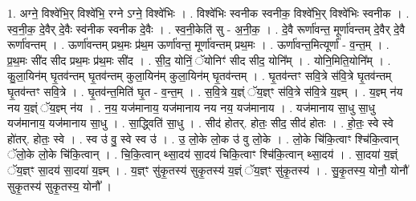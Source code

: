 \documentclass[17pt]{extarticle}
\begin{document}
1. अग्ने॒ विश्वे॑भि॒र् विश्वे॑भि॒ रग्ने ऽग्ने॒ विश्वे॑भिः । . विश्वे॑भिः स्वनीक स्वनीक॒ विश्वे॑भि॒र् विश्वे॑भिः स्वनीक । . स्व॒नी॒क॒ दे॒वैर् दे॒वैः स्व॑नीक स्वनीक दे॒वैः । . स्व॒नी॒केति॑ सु - अ॒नी॒क॒ । . दे॒वै रूर्णा॑वन्त॒ मूर्णा॑वन्तम् दे॒वैर् दे॒वै रूर्णा॑वन्तम् । . ऊर्णा॑वन्तम् प्रथ॒मः प्र॑थ॒म ऊर्णा॑वन्त॒ मूर्णा॑वन्तम् प्रथ॒मः । . ऊर्णा॑वन्त॒मित्यूर्णा᳚ - व॒न्त॒म् । . प्र॒थ॒मः सी॑द सीद प्रथ॒मः प्र॑थ॒मः सी॑द । . सी॒द॒ योनिं॒ ॅयोनिꣳ॑ सीद सीद॒ योनि᳚म् । . योनि॒मिति॒योनि᳚म् । . कु॒ला॒यिन॑म् घृ॒तव॑न्तम् घृ॒तव॑न्तम् कुला॒यिन॑म् कुला॒यिन॑म् घृ॒तव॑न्तम् । . घृ॒तव॑न्तꣳ सवि॒त्रे स॑वि॒त्रे घृ॒तव॑न्तम् घृ॒तव॑न्तꣳ सवि॒त्रे । . घृ॒तव॑न्त॒मिति॑ घृ॒त - व॒न्त॒म् । . स॒वि॒त्रे य॒ज्ञ्ं ॅय॒ज्ञ्ꣳ स॑वि॒त्रे स॑वि॒त्रे य॒ज्ञ्म् । . य॒ज्ञ्म् न॑य नय य॒ज्ञ्ं ॅय॒ज्ञ्म् न॑य । . न॒य॒ यज॑मानाय॒ यज॑मानाय नय नय॒ यज॑मानाय । . यज॑मानाय सा॒धु सा॒धु यज॑मानाय॒ यज॑मानाय सा॒धु । . सा॒द्ध्विति॑ सा॒धु । . सीद॑ होतर्. होतः॒ सीद॒ सीद॑ होतः । . हो॒तः॒ स्वे स्वे हो॑तर्. होतः॒ स्वे । . स्व उ॑ वु॒ स्वे स्व उ॑ । . उ॒ लो॒के लो॒क उ॑ वु लो॒के । . लो॒के चि॑कि॒त्वाꣳ श्चि॑कि॒त्वान् ॅलो॒के लो॒के चि॑कि॒त्वान् । . चि॒कि॒त्वान् थ्सा॒दय॑ सा॒दय॑ चिकि॒त्वाꣳ श्चि॑कि॒त्वान् थ्सा॒दय॑ । . सा॒दया॑ य॒ज्ञ्ं ॅय॒ज्ञ्ꣳ सा॒दय॑ सा॒दया॑ य॒ज्ञ्म् । . य॒ज्ञ्ꣳ सु॑कृ॒तस्य॑ सुकृ॒तस्य॑ य॒ज्ञ्ं ॅय॒ज्ञ्ꣳ सु॑कृ॒तस्य॑ । . सु॒कृ॒तस्य॒ योनौ॒ योनौ॑ सुकृ॒तस्य॑ सुकृ॒तस्य॒ योनौ᳚ । \newline
\end{document}
